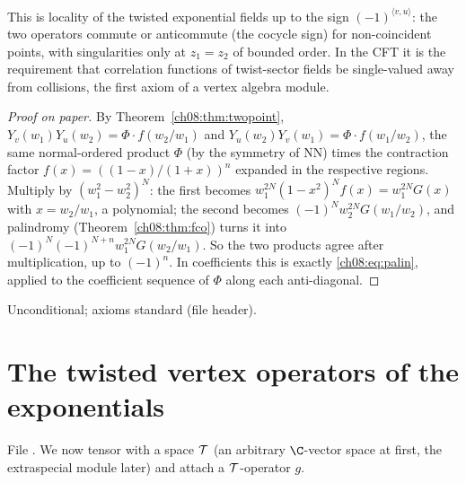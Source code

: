 \begin{physics}
This is locality of the twisted exponential fields up to the sign $(-1)^{\langle v,u\rangle}$: the two operators commute or anticommute (the cocycle sign) for non-coincident points, with singularities only at $z_1=z_2$ of bounded order. In the CFT it is the requirement that correlation functions of twist-sector fields be single-valued away from collisions, the first axiom of a vertex algebra module.
\end{physics}
\begin{proof}[Proof on paper]
By Theorem~\ref{ch08:thm:twopoint}, $Y_v(w_1)Y_u(w_2)=\Phi\cdot f(w_2/w_1)$ and
$Y_u(w_2)Y_v(w_1)=\Phi\cdot f(w_1/w_2)$, the same normal-ordered product $\Phi$ (by the symmetry of
$\mathrm{NN}$) times the contraction factor $f(x)=((1-x)/(1+x))^n$ expanded in the respective
regions.  Multiply by $(w_1^2-w_2^2)^N$: the first becomes $w_1^{2N}(1-x^2)^Nf(x)=w_1^{2N}G(x)$
with $x=w_2/w_1$, a polynomial; the second becomes $(-1)^Nw_2^{2N}G(w_1/w_2)$, and palindromy
(Theorem~\ref{ch08:thm:fco}) turns it into $(-1)^N(-1)^{N+n}w_1^{2N}G(w_2/w_1)$.  So the two
products agree after multiplication, up to $(-1)^n$.  In coefficients this is exactly
\eqref{ch08:eq:palin}, applied to the coefficient sequence of $\Phi$ along each anti-diagonal.
\end{proof}
\begin{status}
Unconditional; axioms standard (file header).
\end{status}

\section{The twisted vertex operators of the exponentials}\label{ch08:sec:vertex}

File .  We now tensor with a space $\mathcal{T}$
(an arbitrary $\C$-vector space  at first, the extraspecial module later) and attach a
$\mathcal{T}$-operator $g$.

